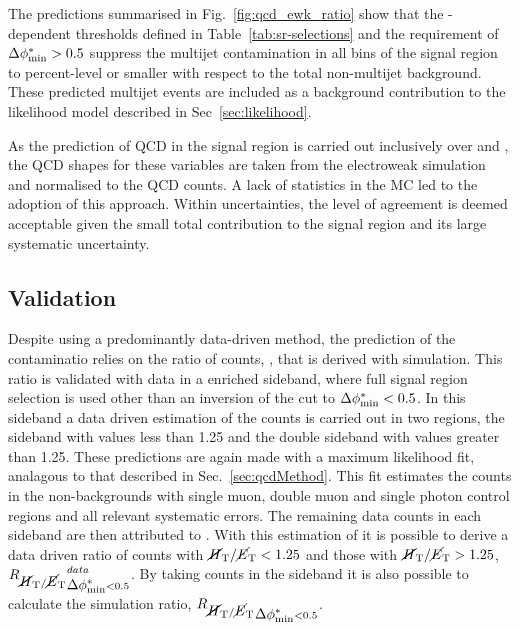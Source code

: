 
The predictions summarised in Fig.~\ref{fig:qcd_ewk_ratio} show that 
the \HT-dependent \alphat thresholds defined in Table~\ref{tab:sr-selections} 
and the requirement of $\mbox{$\Delta\phi^{*}_{\rm min}$} > 0.5$ suppress the multijet
contamination in all bins of the signal region to percent-level or smaller with
respect to the total non-multijet background. These predicted multijet events are 
included as a background contribution to the likelihood model
described in Sec~\ref{sec:likelihood}.

As the prediction of QCD in the signal region is carried out
inclusively over \nb and \mht, the QCD shapes for these variables are
taken from the electroweak simulation and normalised to the QCD counts. A
lack of statistics in the \QCD MC led to the adoption of this approach.
Within uncertainties, the level of
agreement is deemed acceptable given the small total \QCD contribution to the
signal region and its large systematic uncertainty. 

\subsection{Validation} 

Despite using a predominantly data-driven method, the prediction of
the \QCD contaminatio relies on the ratio of \QCD counts, \rmhtmet,
that is derived with simulation. This ratio is validated with data in
a \QCD enriched sideband, where full signal region selection is used
other than an inversion of the \bdphi cut to $\mbox{$\Delta\phi^{*}_{\rm min}$}<0.5$. In this
sideband a data driven estimation of the \QCD counts is carried out in
two regions, the \bdphi sideband with \mhtmet values less than 1.25
and the double sideband with
values greater than 1.25. These predictions are again made with a maximum
likelihood fit, analagous to that described in
Sec.~\ref{sec:qcdMethod}. This fit estimates the counts in the
non-\QCD backgrounds with single muon, double muon and single
photon control regions and all relevant systematic errors. The
remaining data counts in each sideband are then attributed to \QCD.
With this estimation of \QCD it is possible to derive a data driven
ratio of \QCD counts with $\mbox{$\mbox{$\cancel{H}_\text{T}$} / \mbox{$\cancel{E}_\text{T}$}$}<1.25$ and those with $\mbox{$\mbox{$\cancel{H}_\text{T}$} / \mbox{$\cancel{E}_\text{T}$}$}>1.25$,
$\mbox{$R_{\mbox{$\cancel{H}_\text{T}$} / \mbox{$\cancel{E}_\text{T}$}}$}_{\mbox{$\Delta\phi^{*}_{\rm min}$}<0.5}^{data}$. By taking \MC counts in the \bdphi
sideband it is also possible to calculate the \mhtmet simulation
ratio, $\mbox{$R_{\mbox{$\cancel{H}_\text{T}$} / \mbox{$\cancel{E}_\text{T}$}}$}_{\mbox{$\Delta\phi^{*}_{\rm min}$}<0.5}$. 

